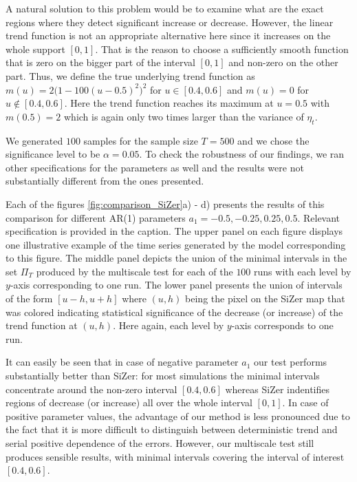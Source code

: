 \documentclass[a4paper,12pt]{article}
\begin{document}
A natural solution to this problem would be to examine what are the exact regions where they detect significant increase or decrease. However, the linear trend function is not an appropriate alternative here since it increases on the whole support $[0, 1]$. That is the reason to choose a sufficiently smooth function that is zero on the bigger part of the interval $[0, 1]$ and non-zero on the other part. Thus, we define the true underlying trend function as $m(u) = 2\big(1 - 100(u - 0.5)^2\big)^2$ for $u \in [0.4, 0.6]$ and $m(u) = 0$ for $u \notin [0.4, 0.6]$. Here the trend function reaches its maximum at $u = 0.5$ with $m(0.5) = 2$ which is again only two times larger than the variance of $\eta_t$.

We generated $100$ samples for the sample size $T = 500$ and we chose the significance level to be $\alpha = 0.05$. To check the robustness of our findings, we ran other specifications for the parameters as well and the results were not substantially different from the ones presented.

Each of the figures \ref{fig:comparison_SiZer}a) - d)  presents the results of this comparison for different AR(1) parameters $a_1 = -0.5, -0.25, 0.25, 0.5$. Relevant specification is provided in the caption. The upper panel on each figure displays one illustrative example of the time series generated by the model corresponding to this figure. The middle panel depicts the union of the minimal intervals in the set $\Pi_T$ produced by the multiscale test for each of the $100$ runs with each level by $y$-axis corresponding to one run. The lower panel presents the union of intervals of the form $[u - h, u + h]$ where $(u, h)$ being the pixel on the SiZer map that was colored indicating statistical significance of the decrease (or increase) of the trend function at $(u, h)$. Here again, each level by $y$-axis corresponds to one run.

It can easily be seen that in case of negative parameter $a_1$ our test performs substantially better than SiZer: for most simulations the minimal intervals concentrate around the non-zero interval $[0.4, 0.6]$ whereas SiZer indentifies regions of decrease (or increase) all over the whole interval $[0, 1]$. In case of positive parameter values, the advantage of our method is less pronounced due to the fact that it is more difficult to distinguish between deterministic trend and serial positive dependence of the errors. However, our multiscale test still produces sensible results, with minimal intervals covering the interval of interest $[0.4, 0.6]$. 
\end{document}
